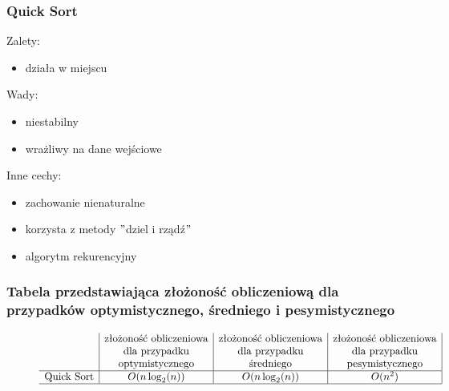\documentclass[polish,polish,a4paper]{article}
\begin{document}
\begin{spacing}{1.5}
		\subsubsection*{Quick Sort}
	Zalety:
	\begin{itemize}
		\item działa w miejscu
	\end{itemize}
	Wady:
	\begin{itemize}
		\item niestabilny
		\item wrażliwy na dane wejściowe 
	\end{itemize}
	Inne cechy:
	\begin{itemize}
		\item zachowanie nienaturalne
		\item korzysta z metody $"$dziel i rządź$"$
		\item algorytm rekurencyjny
	\end{itemize}
	
	\subsubsection*{Tabela przedstawiająca złożoność obliczeniową dla przypadków optymistycznego, średniego i pesymistycznego} 
	\begin{figure}[H]
		
		\begin{equation*}
		\begin{array}{l|c|c|c|}

		&$złożoność obliczeniowa$&$złożoność obliczeniowa$&$złożoność obliczeniowa$\\
		&$dla przypadku$&$dla przypadku$&$dla przypadku$\\
		&$optymistycznego$&$średniego$&$pesymistycznego$\\
		\hline
		$Quick Sort$&O(n\log_{2}(n))&O(n\log_{2}(n))&O(n^2)\\
		\hline
		\end{array}
		\end{equation*}
	\end{figure}
	

\end{spacing}
\end{document}
